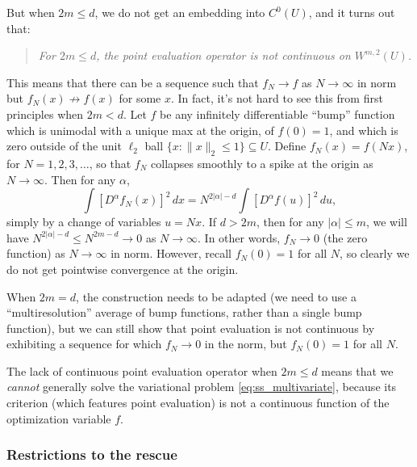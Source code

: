 \documentclass{article}
\begin{document}
But when $2m \leq d$, we do not get an embedding into $C^0(U)$, and it turns out   
that: 
\begin{quote}
\centering\it
For $2m \leq d$, the point evaluation operator is not continuous on
$W^{m,2}(U)$.       
\end{quote}
This means that there can be a sequence such that $f_N \to f$ as $N \to \infty$
in  norm but $f_N(x) \not\to f(x)$ for some
$x$. In fact, it's not hard to see this from first principles when $2m < d$. Let
$f$ be any infinitely differentiable ``bump'' function which is unimodal with a
unique max at the origin, of $f(0) = 1$, and which is zero outside of the unit
$\ell_2$ ball $\{x : \|x\|_2 \leq 1\} \subseteq U$. Define $f_N(x) = f(Nx)$, for 
$N=1,2,3,\dots$, so that $f_N$ collapses smoothly to a spike at the origin as $N 
\to \infty$. Then for any $\alpha$,   
\[
\int [D^\alpha f_N(x)]^2 \, dx = N^{2|\alpha|-d} \int
[D^\alpha f(u)]^2 \, du,  
\]
simply by a change of variables $u = N x$. If $d > 2m$, then for any $|\alpha|
\leq m$, we will have $N^{2|\alpha|-d} \leq N^{2m-d} \to 0$ as $N \to
\infty$. In other words, $f_N \to 0$ (the zero function) as $N \to \infty$ in
 norm. However, recall $f_N(0) = 1$ for all $N$,
so clearly we do not get pointwise convergence at the origin. 

When $2m = d$, the construction needs to be adapted (we need to use a
``multiresolution'' average of bump functions, rather than a single bump
function), but we can still show that point evaluation is not continuous by
exhibiting a sequence for which $f_N \to 0$ in the
 norm, but $f_N(0) = 1$ for all $N$.  


The lack of continuous point evaluation operator when $2m \leq d$ means that we
\emph{cannot} generally solve the variational problem  
\eqref{eq:ss_multivariate}, because its criterion (which features point
evaluation) is not a continuous function of the optimization variable $f$.    

\subsubsection{Restrictions to the rescue}
\end{document}
